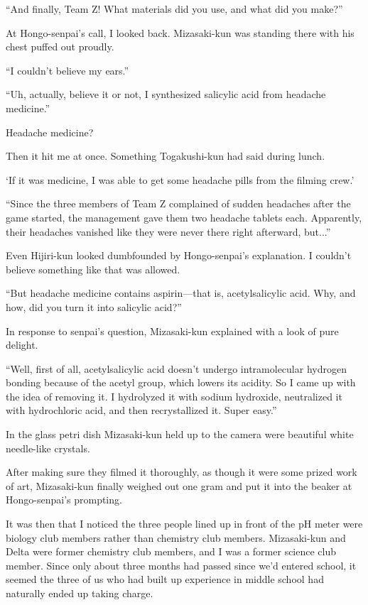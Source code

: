 \documentclass[
    a4paper,
    12pt,
    twoside,
    openany,
    UTF8,
    fontset=windows
]{ctexbook}
\begin{document}
``And finally, Team Z! What materials did you use, and what did you make?''

At Hongo-senpai's call, I looked back. Mizasaki-kun was standing there with his chest puffed out proudly.

``I couldn't believe my ears.''

``Uh, actually, believe it or not, I synthesized salicylic acid from headache medicine.''

Headache medicine?

Then it hit me at once. Something Togakushi-kun had said during lunch.

`If it was medicine, I was able to get some headache pills from the filming crew.'

``Since the three members of Team Z complained of sudden headaches after the game started, the management gave them two headache tablets each. Apparently, their headaches vanished like they were never there right afterward, but...''

Even Hijiri-kun looked dumbfounded by Hongo-senpai's explanation. I couldn't believe something like that was allowed.

``But headache medicine contains aspirin---that is, acetylsalicylic acid. Why, and how, did you turn it into salicylic acid?''

In response to senpai's question, Mizasaki-kun explained with a look of pure delight.

``Well, first of all, acetylsalicylic acid doesn't undergo intramolecular hydrogen bonding because of the acetyl group, which lowers its acidity. So I came up with the idea of removing it. I hydrolyzed it with sodium hydroxide, neutralized it with hydrochloric acid, and then recrystallized it. Super easy.''

In the glass petri dish Mizasaki-kun held up to the camera were beautiful white needle-like crystals.

After making sure they filmed it thoroughly, as though it were some prized work of art, Mizasaki-kun finally weighed out one gram and put it into the beaker at Hongo-senpai's prompting.

It was then that I noticed the three people lined up in front of the pH meter were biology club members rather than chemistry club members. Mizasaki-kun and Delta were former chemistry club members, and I was a former science club member. Since only about three months had passed since we'd entered school, it seemed the three of us who had built up experience in middle school had naturally ended up taking charge.
\end{document}
